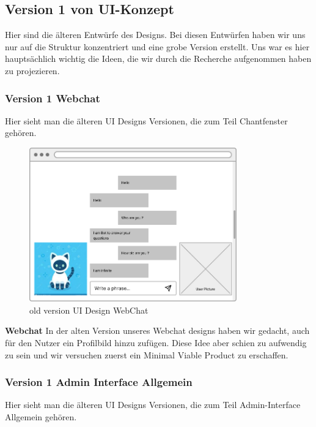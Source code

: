 \subsection{Version 1 von UI-Konzept}

Hier sind die älteren Entwürfe des Designs. Bei diesen Entwürfen haben wir uns nur auf die Struktur
konzentriert und eine grobe Version erstellt. Uns war es hier hauptsächlich wichtig
die Ideen, die wir durch die Recherche aufgenommen haben zu projezieren.
\\

\subsubsection{Version 1 Webchat}
Hier sieht man die älteren UI Designs Versionen, die zum Teil Chantfenster gehören.

\begin{figure}[H]
    \centering
    \includegraphics[width=0.8\textwidth]{bilder/old vers. UI Design/WebChat.png}
    \caption{old version UI Design WebChat}
    \label{fig:old version UI Design WebChat}
    \end{figure}
\noindent \textbf{Webchat} \newline
In der alten Version unseres Webchat designs haben wir gedacht, auch für den
Nutzer ein Profilbild hinzu zufügen. Diese Idee aber schien zu aufwendig zu sein und wir versuchen
zuerst ein Minimal Viable Product zu erschaffen.                                                     

\newpage

\subsubsection{Version 1 Admin Interface Allgemein}
Hier sieht man die älteren UI Designs Versionen, die zum Teil Admin-Interface Allgemein gehören.

